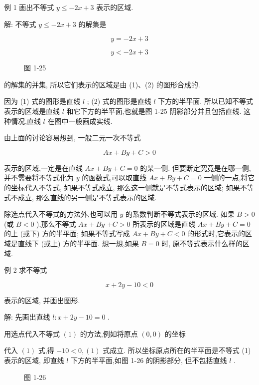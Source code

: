 \documentclass[lang=cn,newtx,12pt,scheme=chinese]{elegantbook}
\begin{document}
例 1 画出不等式 \(y \leq - {2x} + 3\) 表示的区域.

解: 不等式 \(y \leq - {2x} + 3\) 的解集是

\[
  y = - {2x} + 3 \tag{1}
\]

\[
  y < - {2x} + 3 \tag{2}
\]

\begin{figure}[h]
  \centering
  
  \caption{图 1-25}
\end{figure}

的解集的并集, 所以它们表示的区域是由 (1)、(2) 的图形合成的.

因为 (1) 式的图形是直线 \(l\) ; (2) 式的图形是直线 \(l\) 下方的半平面. 所以已知不等式表示的区域是直线 \(l\) 和它下方的半平面,也就是图 1-25 阴影部分并且包括直线. 这种情况,直线 \(l\) 在图中一般画成实线.

由上面的讨论容易想到, 一般二元一次不等式

\[
    {Ax} + {By} + C > 0
\]

表示的区域,一定是在直线 \({Ax} + {By} + C = 0\) 的某一侧. 但要断定究竟是在哪一侧,并不需要将不等式化为 \(y\) 的函数式,可以取直线 \({Ax} + {By} + C = 0\) 一侧的一点,将它的坐标代入不等式, 如果不等式成立, 那么这一侧就是不等式表示的区域; 如果不等式不成立, 那么直线的另一侧是不等式表示的区域.

除选点代入不等式的方法外,也可以用 \(y\) 的系数判断不等式表示的区域. 如果 \(B > 0\) (或 \(B < 0\) ),那么不等式 \({Ax} + {By}\) \(+ C > 0\) 所表示的区域是直线 \({Ax} + {By} + C = 0\) 的上 (或下) 方的半平面; 如果不等式写成 \({Ax} + {By} + C < 0\) 的形式时,它表示的区域是直线下 (或上) 方的半平面. 想一想,如果 \(B = 0\) 时, 原不等式表示什么样的区域.

例 2 求不等式

\[
  x + {2y} - {10} < 0 \tag{1}
\]

表示的区域, 并画出图形.

解: 先画出直线 \(l : x + {2y} - {10} = 0\) .

用选点代入不等式 \(\left( 1\right)\) 的方法,例如将原点 \(\left( {0,0}\right)\) 的坐标

代入 \(\left( 1\right)\) 式,得 \(- {10} < 0,\left( 1\right)\) 式成立. 所以坐标原点所在的半平面是不等式 (1) 表示的区域, 即直线 \(l\) 下方的半平面,如图 1-26 的阴影部分, 但不包括直线 \(l\) .

\begin{figure}[h]
  \centering
  
  \caption{图 1-26}
\end{figure}
\end{document}
